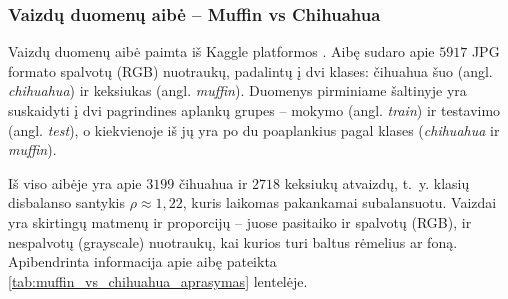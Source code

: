 \subsubsection{Vaizdų duomenų aibė – Muffin vs Chihuahua}
\label{subsubsec:muffin_vs_chihuahua}

Vaizdų duomenų aibė paimta iš Kaggle platformos \cite{muffin_vs_chihuahua}. Aibę sudaro apie $5917$ JPG formato spalvotų (RGB) nuotraukų, padalintų į dvi klases: čihuahua šuo (angl. \textit{chihuahua}) ir keksiukas (angl. \textit{muffin}). Duomenys pirminiame šaltinyje yra suskaidyti į dvi pagrindines aplankų grupes – mokymo (angl. \textit{train}) ir testavimo (angl. \textit{test}), o kiekvienoje iš jų yra po du poaplankius pagal klases (\textit{chihuahua} ir \textit{muffin}).

Iš viso aibėje yra apie $3199$ čihuahua ir $2718$ keksiukų atvaizdų, t.~y. klasių disbalanso santykis $\rho \approx 1{,}22$, kuris laikomas pakankamai subalansuotu. Vaizdai yra skirtingų matmenų ir proporcijų – juose pasitaiko ir spalvotų (RGB), ir nespalvotų (grayscale) nuotraukų, kai kurios turi baltus rėmelius ar foną. Apibendrinta informacija apie aibę pateikta \ref{tab:muffin_vs_chihuahua_aprasymas} lentelėje.


